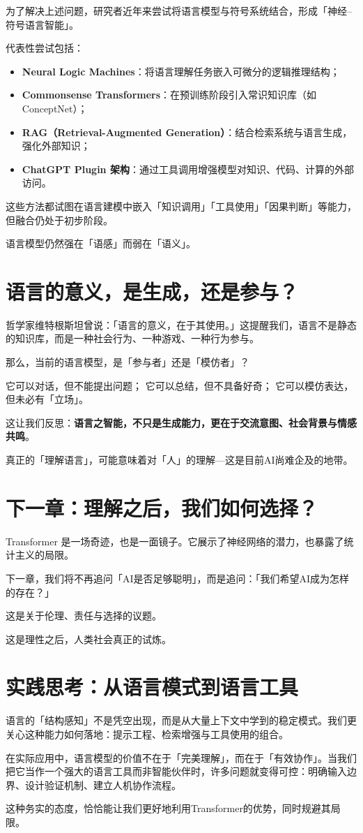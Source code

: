 为了解决上述问题，研究者近年来尝试将语言模型与符号系统结合，形成「神经–符号语言智能」。

代表性尝试包括：
\begin{itemize}
\item \textbf{Neural Logic Machines}：将语言理解任务嵌入可微分的逻辑推理结构；
\item \textbf{Commonsense Transformers}：在预训练阶段引入常识知识库（如 ConceptNet）；
\item \textbf{RAG（Retrieval-Augmented Generation）}：结合检索系统与语言生成，强化外部知识；
\item \textbf{ChatGPT Plugin 架构}：通过工具调用增强模型对知识、代码、计算的外部访问。
\end{itemize}

这些方法都试图在语言建模中嵌入「知识调用」「工具使用」「因果判断」等能力，但融合仍处于初步阶段。

语言模型仍然强在「语感」而弱在「语义」。

\section*{语言的意义，是生成，还是参与？}

哲学家维特根斯坦曾说：「语言的意义，在于其使用。」这提醒我们，语言不是静态的知识库，而是一种社会行为、一种游戏、一种行为参与。

那么，当前的语言模型，是「参与者」还是「模仿者」？

它可以对话，但不能提出问题；
它可以总结，但不具备好奇；
它可以模仿表达，但未必有「立场」。

这让我们反思：\textbf{语言之智能，不只是生成能力，更在于交流意图、社会背景与情感共鸣}。

真正的「理解语言」，可能意味着对「人」的理解---这是目前AI尚难企及的地带。

\section*{下一章：理解之后，我们如何选择？}

Transformer 是一场奇迹，也是一面镜子。它展示了神经网络的潜力，也暴露了统计主义的局限。

下一章，我们将不再追问「AI是否足够聪明」，而是追问：「我们希望AI成为怎样的存在？」

这是关于伦理、责任与选择的议题。

这是理性之后，人类社会真正的试炼。

\section*{实践思考：从语言模式到语言工具}

语言的「结构感知」不是凭空出现，而是从大量上下文中学到的稳定模式。我们更关心这种能力如何落地：提示工程、检索增强与工具使用的组合。

在实际应用中，语言模型的价值不在于「完美理解」，而在于「有效协作」。当我们把它当作一个强大的语言工具而非智能伙伴时，许多问题就变得可控：明确输入边界、设计验证机制、建立人机协作流程。

这种务实的态度，恰恰能让我们更好地利用Transformer的优势，同时规避其局限。

\nocite{*}
\printbibliography[heading=bibintoc, title=\ebibname]
\newpage
